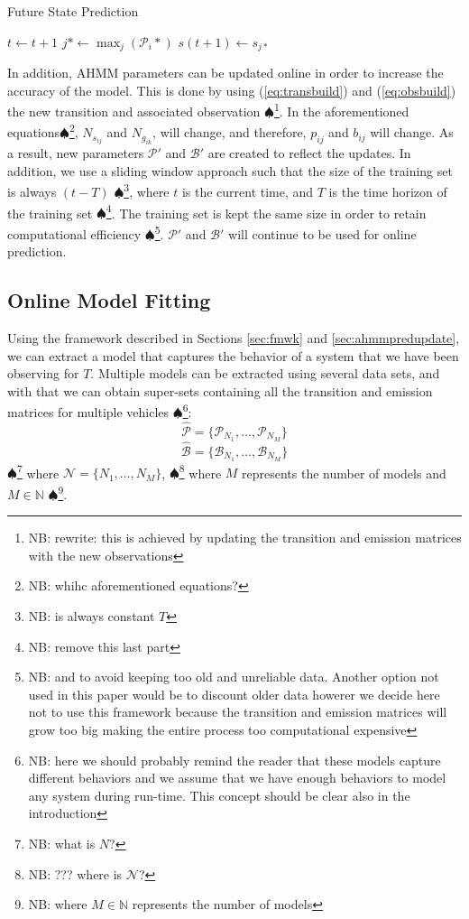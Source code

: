 \documentclass[letterpaper, 10 pt, conference]{ieeeconf}  %
\newcommand\NB[1]{$\spadesuit$\footnote{NB: #1}}
\begin{document}
\begin{algorithm}[ht!]
\caption{Future State Prediction} \label{alg:pred}
\begin{algorithmic}[1]
\STATE $t \gets t+1$
\STATE $j* \gets \max_j(\mathcal{P}_{i}*)$
\ENDFOR
\STATE $s(t+1) \gets s_{j*}$
\ENDWHILE
\end{algorithmic}
\end{algorithm}

In addition, AHMM parameters can be updated online in order to increase the accuracy of the model. This is done by using (\ref{eq:transbuild}) and (\ref{eq:obsbuild}) the new transition and associated observation \NB{rewrite: this is achieved by updating the transition and emission matrices with the new observations}. In the aforementioned equations\NB{whihc aforementioned equations?}, $N_{s_{ij}}$ and $N_{g_{ik}}$, will change, and therefore, $p_{ij}$ and $b_{ij}$ will change. As a result, new parameters $\mathcal{P'}$ and $\mathcal{B'}$ are created to reflect the updates. In addition, we use a sliding window approach such that the size of the training set is always $(t-T)$ \NB{is always constant $T$}, where $t$ is the current time, and $T$ is the time horizon of the training set \NB{remove this last part}. The training set is kept the same size in order to retain computational efficiency \NB{and to avoid keeping too old and unreliable data. Another option not used in this paper would be to discount older data howerer we decide here not to use this framework because the transition and emission matrices will grow too big making the entire process too computational expensive}. $\mathcal{P'}$ and $\mathcal{B'}$ will continue to be used for online prediction. %

\subsection{Online Model Fitting}\label{sec:omf} %
Using the framework described in Sections \ref{sec:fmwk} and \ref{sec:ahmmpredupdate},  we can extract a model that captures the behavior of a system that we have been observing for $T$. Multiple models can be extracted using several data sets, and with that we can obtain super-sets containing all the transition and emission matrices for multiple vehicles \NB{here we should probably remind the reader that these models capture different behaviors and we assume that we have enough behaviors to model any system during run-time. This concept should be clear also in the introduction}: 
\begin{equation}
    \hat{\mathcal{P}} = \{\mathcal{P}_{N_{1}},\ldots,\mathcal{P}_{N_{M}}\}
\end{equation}
\begin{equation}
    \hat{\mathcal{B}} = \{\mathcal{B}_{N_{1}},\ldots,\mathcal{B}_{N_{M}}\}
\end{equation}
\NB{what is $N$?}
where $\mathcal{N} = \{N_1,\ldots,N_M\}$, \NB{??? where is $\mathcal{N}$?} where $M$ represents the number of models and $M\in\mathbb{N}$ \NB{where $M\in\mathbb{N}$ represents the number of models}.
\end{document}
